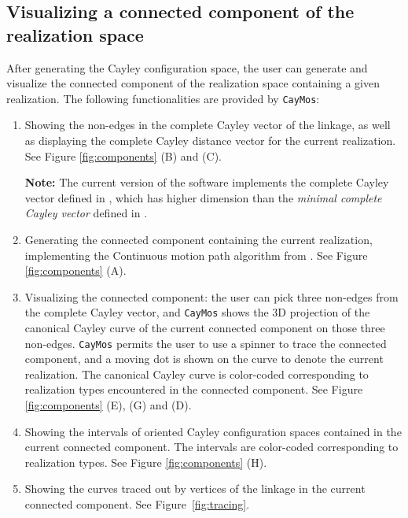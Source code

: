 \documentclass[10pt]{article}
\begin{document}


\subsection{Visualizing a connected component of the realization space}\label{subsec:connected_component}


After generating the Cayley configuration space, 
the user can generate and visualize the connected component of the realization space containing a given realization. 
The following functionalities are provided by \texttt{CayMos}:  

\begin{enumerate}

\item Showing the non-edges in the complete Cayley vector of the linkage, 
as well as displaying the complete Cayley distance vector for the current realization. 
See Figure \ref{fig:components} (B) and (C). 

\noindent\textbf{Note:} The current version of the software implements the complete Cayley vector defined in \cite{sitharam2014beast}, which has higher dimension than the \emph{minimal complete Cayley vector} defined in \cite{Sitharam2011a}.

\item Generating the connected component containing the current realization, 
implementing the Continuous motion path algorithm from \cite{Sitharam2011a}.
See Figure \ref{fig:components} (A). 


\item Visualizing the connected component: 
the user can pick three non-edges from the complete Cayley vector, 
and \texttt{CayMos} shows the 3D projection of the canonical Cayley curve of the current connected component on those three non-edges. 
\texttt{CayMos} permits the user to use a spinner to trace the connected component, 
and a moving dot is shown on the curve to denote the current realization.
The canonical Cayley curve is color-coded corresponding to realization types encountered in the connected component. 
See Figure \ref{fig:components} (E), (G) and (D). 

\item Showing the intervals of oriented Cayley configuration spaces contained in the current connected component. 
The intervals are color-coded corresponding to realization types. 
See Figure \ref{fig:components} (H). 

\item Showing the curves traced out by vertices of the linkage in the current connected component. 
See Figure~\ref{fig:tracing}.

\end{enumerate}
\end{document}
